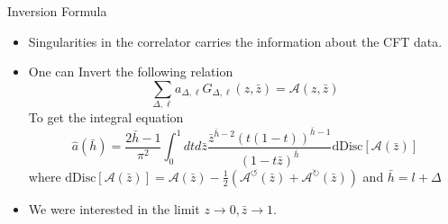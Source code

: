 \documentclass[pdf]{beamer}
\begin{document}
                \begin{frame}[t]{Inversion Formula}
                    \begin{itemize}
                        \item <2-> Singularities in the correlator carries the information about the CFT data.
                        \item <3-> One can Invert the following relation 
                        \begin{equation*}
                            \sum_{\Delta,\ell}a_{\Delta,\ell}G_{\Delta,\ell}(z,\bar{z}) = \mathcal{A}(z,\bar{z})
                        \end{equation*}
                        To get the integral equation\footnotemark
                        \begin{equation*}
                            \hat{a}(\bar{h}) = \frac{2\bar{h}-1}{\pi^2}\int_0^1dtd\bar{z}\frac{\bar{z}^{\bar{h}-2}(t(1-t))^{\bar{h}-1}}{(1-t\bar{z})^{\bar{h}}}\text{dDisc}[\mathcal{A}(\bar{z})]
                        \end{equation*}
                         where $\text{dDisc}[\mathcal{A}(\bar{z})] = \mathcal{A}(\bar{z}) - \frac{1}{2}\left(\mathcal{A}^{\circlearrowleft}(\bar{z}) + \mathcal{A}^{\circlearrowright}(\bar{z}) \right)$ and $\bar{h} = l+\Delta$
                    \end{itemize}
                    \begin{itemize}
                        \item<6-> We were interested in the limit $z\to0,\bar{z}\to1$.
                    \end{itemize}
                \end{frame}
\end{document}
